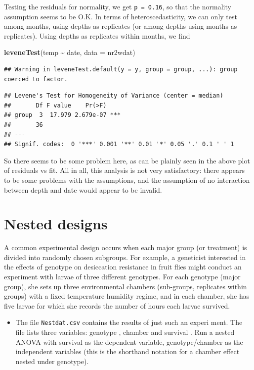 \documentclass[
  12pt,
]{book}
\newenvironment{Shaded}{\begin{snugshade}}{\end{snugshade}}
\newcommand{\DataTypeTok}[1]{\textcolor[rgb]{0.13,0.29,0.53}{#1}}
\newcommand{\KeywordTok}[1]{\textcolor[rgb]{0.13,0.29,0.53}{\textbf{#1}}}
\newcommand{\NormalTok}[1]{#1}
\newcommand{\OperatorTok}[1]{\textcolor[rgb]{0.81,0.36,0.00}{\textbf{#1}}}
\newcommand{\StringTok}[1]{\textcolor[rgb]{0.31,0.60,0.02}{#1}}
\providecommand{\tightlist}{%
  \setlength{\itemsep}{0pt}\setlength{\parskip}{0pt}}
\begin{document}
Testing the residuals for normality, we get \texttt{p\ =\ 0.16}, so that the normality assumption seems to be O.K. In terms of heteroscedasticity, we can only test among months, using depths as replicates (or among depths using months as replicates). Using depths as replicates within months, we find

\begin{Shaded}
\begin{Highlighting}[]
\KeywordTok{leveneTest}\NormalTok{(temp }\OperatorTok{\textasciitilde{}}\StringTok{ }\NormalTok{date, }\DataTypeTok{data =}\NormalTok{ nr2wdat)}
\end{Highlighting}
\end{Shaded}

\begin{verbatim}
## Warning in leveneTest.default(y = y, group = group, ...): group coerced to factor.
\end{verbatim}

\begin{verbatim}
## Levene's Test for Homogeneity of Variance (center = median)
##       Df F value    Pr(>F)    
## group  3  17.979 2.679e-07 ***
##       36                      
## ---
## Signif. codes:  0 '***' 0.001 '**' 0.01 '*' 0.05 '.' 0.1 ' ' 1
\end{verbatim}

So there seems to be some problem here, as can be plainly seen in the above plot of residuals vs fit. All in all, this analysis is not very satisfactory: there appears to be some problems with the assumptions, and the assumption of no interaction between depth and date would appear to be invalid.

\hypertarget{nested-designs}{%
\section{Nested designs}\label{nested-designs}}

A common experimental design occurs when each major group (or treatment) is divided into randomly chosen subgroups. For example, a geneticist interested in the effects of genotype on desiccation resistance in fruit flies might conduct an experiment with larvae of three different genotypes. For each genotype (major group), she sets up three environmental chambers (sub-groups, replicates within groups) with a fixed temperature humidity regime, and in each chamber, she has five larvae for which she records the number of hours each larvae survived.

\begin{itemize}
\tightlist
\item
  The file \texttt{Nestdat.csv} contains the results of just such an experi ment. The file lists three variables: genotype , chamber and survival . Run a nested ANOVA with survival as the dependent variable, genotype/chamber as the independent variables (this is the shorthand notation for a chamber effect nested under genotype).
\end{itemize}
\end{document}

